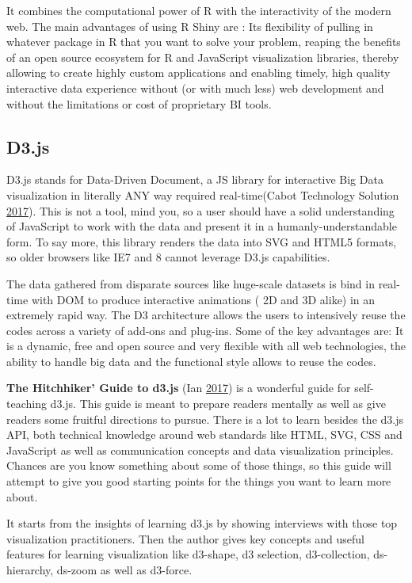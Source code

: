 \documentclass[]{book}
\begin{document}
It combines the computational power of R with the interactivity of the modern web. The main advantages of using R Shiny are : Its flexibility of pulling in whatever package in R that you want to solve your problem, reaping the benefits of an open source ecosystem for R and JavaScript visualization libraries, thereby allowing to create highly custom applications and enabling timely, high quality interactive data experience without (or with much less) web development and without the limitations or cost of proprietary BI tools.

\hypertarget{d3.js}{%
\subsection{D3.js}\label{d3.js}}

D3.js stands for Data-Driven Document, a JS library for interactive Big Data visualization in literally ANY way required real-time(Cabot Technology Solution \protect\hyperlink{ref-d3_interactive_viz}{2017}). This is not a tool, mind you, so a user should have a solid understanding of JavaScript to work with the data and present it in a humanly-understandable form. To say more, this library renders the data into SVG and HTML5 formats, so older browsers like IE7 and 8 cannot leverage D3.js capabilities.

The data gathered from disparate sources like huge-scale datasets is bind in real-time with DOM to produce interactive animations ( 2D and 3D alike) in an extremely rapid way. The D3 architecture allows the users to intensively reuse the codes across a variety of add-ons and plug-ins. Some of the key advantages are: It is a dynamic, free and open source and very flexible with all web technologies, the ability to handle big data and the functional style allows to reuse the codes.

\textbf{The Hitchhiker' Guide to d3.js} (Ian \protect\hyperlink{ref-Medium}{2017}) is a wonderful guide for self-teaching d3.js. This guide is meant to prepare readers mentally as well as give readers some fruitful directions to pursue. There is a lot to learn besides the d3.js API, both technical knowledge around web standards like HTML, SVG, CSS and JavaScript as well as communication concepts and data visualization principles. Chances are you know something about some of those things, so this guide will attempt to give you good starting points for the things you want to learn more about.

It starts from the insights of learning d3.js by showing interviews with those top visualization practitioners. Then the author gives key concepts and useful features for learning visualization like d3-shape, d3 selection, d3-collection, ds-hierarchy, ds-zoom as well as d3-force.
\end{document}
